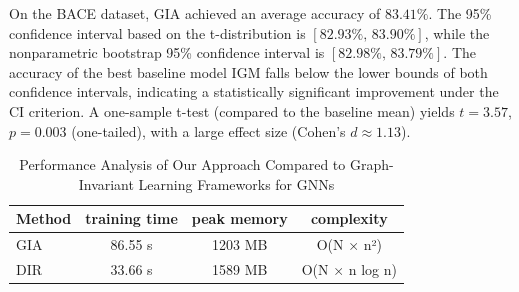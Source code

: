 \documentclass[a4paper,fleqn]{cas-dc}
\begin{document}
{On the BACE \cite{hu2020open} dataset, GIA achieved an average accuracy of \(83.41\%\). The 95\% confidence interval based on the t-distribution is \([82.93\%,\,83.90\%]\), while the nonparametric bootstrap 95\% confidence interval is \([82.98\%,\,83.79\%]\). The accuracy of the best baseline model IGM falls below the lower bounds of both confidence intervals, indicating a statistically significant improvement under the CI criterion. A one-sample t-test (compared to the baseline mean) yields \(t=3.57\), \(p=0.003\) (one-tailed), with a large effect size (Cohen's \(d\approx 1.13\)).}

\begin{table}%
\caption{{\color{blue}Performance Analysis of Our Approach Compared to Graph-Invariant Learning Frameworks for GNNs}}
\label{tbl8}
\begin{tabular*}{\tblwidth}{@{}LCCC@{}}
\toprule
\textbf{Method} & \textbf{training time} & \textbf{peak memory} & \textbf{complexity} \\
\midrule
GIA  &86.55 s  &1203 MB  &O(N × n²)  \\
DIR     &33.66 s  &1589 MB  &O(N × n log n)  \\

\bottomrule
\end{tabular*}
\end{table}
\end{document}
